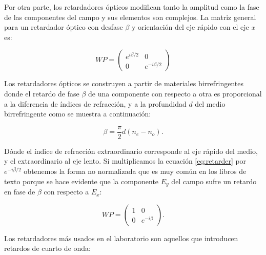 Por otra parte, los retardadores ópticos modifican tanto la amplitud
como la fase de las componentes del campo y sus elementos son
complejos. La matriz general para un retardador óptico con desfase
$\beta $ y orientación del eje rápido con el eje
$x$ es:

\begin{equation*}
WP = 
\begin{pmatrix}
e^{i\beta/2} & 0 \\0&e^{-i\beta/2}  
\end{pmatrix}
\label{eq:retarder}
\end{equation*}

Los retardadores ópticos se construyen a partir de materiales
birrefringentes donde el retardo de fase $\beta$ de una componente con respecto a otra es
proporcional a la diferencia de índices de refracción, y a la
profundidad $d$ del medio birrefringente como se muestra a continuación:

$$\beta= \frac{\pi}{2}d\left(n_e-n_o\right).$$ 

Dónde el índice de refracción extraordinario corresponde al eje rápido
del medio, y el extraordinario al eje lento. Si multiplicamos la
ecuación \ref{eq:retarder} por $e^{-i\beta/2} $ 
obtenemos la forma no normalizada que es muy común en los libros de
texto porque se hace evidente que la componente $E_y$ del campo sufre un
retardo en fase de $\beta$ con respecto a $E_x$: 

\begin{equation*}
WP = 
\begin{pmatrix}
1& 0 \\0&e^{-i\beta}  
\end{pmatrix}.
\label{eq:retarder}
\end{equation*}

Los retardadores más usados en el laboratorio son aquellos que
introducen retardos de cuarto de onda:

